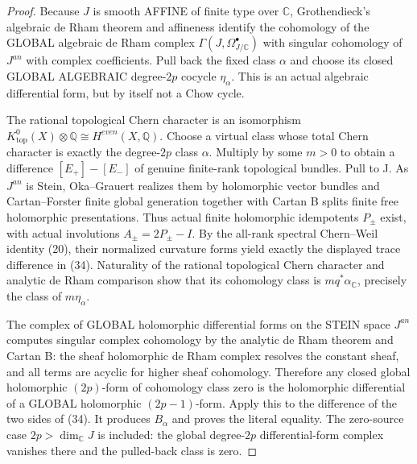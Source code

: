 \documentclass[11pt]{article}
\begin{document}
\begin{proof}
Because $J$ is smooth AFFINE of finite type over $\mathbb C$,
Grothendieck's algebraic de Rham theorem and affineness identify
the cohomology of the GLOBAL algebraic de Rham complex
$\Gamma(J,\Omega^\bullet_{J/\mathbb C})$ with singular cohomology
of $J^{an}$ with complex coefficients. Pull back the fixed
class $\alpha$ and choose its closed GLOBAL ALGEBRAIC
degree-$2p$ cocycle $\eta_\alpha$. This is an actual algebraic
differential form, but by itself not a Chow cycle.

The rational topological Chern character is an
isomorphism $K^0_{\mathrm{top}}(X)\otimes\mathbb Q
 \cong H^{even}(X,\mathbb Q)$.
Choose a virtual class whose total Chern character
is exactly the degree-$2p$ class $\alpha$.
Multiply by some $m>0$ to obtain a difference
$[E_+]-[E_-]$ of genuine finite-rank topological bundles.
Pull to J. As $J^{an}$ is Stein, Oka--Grauert
realizes them by holomorphic vector bundles and
Cartan--Forster finite global generation together with
Cartan B splits finite free holomorphic presentations.
Thus actual finite holomorphic idempotents $P_\pm$
exist, with actual involutions $A_\pm=2P_\pm-I$.
By the all-rank spectral Chern--Weil identity (20),
their normalized curvature forms yield exactly the
displayed trace difference in (34).
Naturality of the rational topological Chern character
and analytic de Rham comparison show that its
cohomology class is $m q^*\alpha_{\mathbb C}$,
precisely the class of $m\eta_\alpha$.

The complex of GLOBAL holomorphic differential forms on
the STEIN space $J^{an}$ computes singular complex
cohomology by the analytic de Rham theorem and
Cartan B: the sheaf holomorphic de Rham complex resolves
the constant sheaf, and all terms are acyclic for
higher sheaf cohomology. Therefore any closed global
holomorphic $(2p)$-form of cohomology class zero is
the holomorphic differential of a GLOBAL
holomorphic $(2p-1)$-form.
Apply this to the difference of the two sides of (34).
It produces $B_\alpha$ and proves the literal equality.
The zero-source case $2p>\dim_\mathbb C J$ is included:
the global degree-$2p$ differential-form complex
vanishes there and the pulled-back class is zero.
\end{proof}
\end{document}
